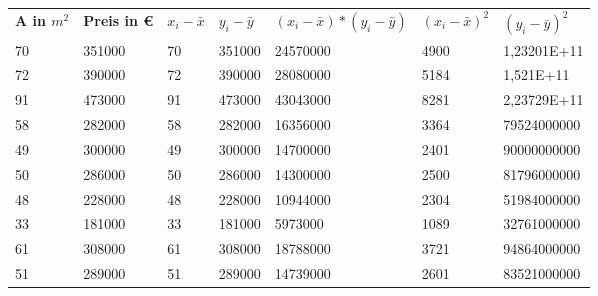 \begin{enumerate}
\begin{table}
\centering
{}
\label{Manuelle Regression}
\begin{tabular}{lllllll}
\textbf{A in $m^{2}$} & \textbf{Preis in \euro{} } & $x_i-\bar{x}$ & $y_i-\bar{y}$ & $(x_i-\bar{x})*(y_i-\bar{y})$ & $(x_i-\bar{x})^{2}$ & $(y_i-\bar{y})^{2}$  \\
70                    & 351000                 & 70                  & 351000              & 24570000                                    & 4900                    & 1,23201E+11             \\
72                    & 390000                 & 72                  & 390000              & 28080000                                    & 5184                    & 1,521E+11               \\
91                    & 473000                 & 91                  & 473000              & 43043000                                    & 8281                    & 2,23729E+11             \\
58                    & 282000                 & 58                  & 282000              & 16356000                                    & 3364                    & 79524000000             \\
49                    & 300000                 & 49                  & 300000              & 14700000                                    & 2401                    & 90000000000             \\
50                    & 286000                 & 50                  & 286000              & 14300000                                    & 2500                    & 81796000000             \\
48                    & 228000                 & 48                  & 228000              & 10944000                                    & 2304                    & 51984000000             \\
33                    & 181000                 & 33                  & 181000              & 5973000                                     & 1089                    & 32761000000             \\
61                    & 308000                 & 61                  & 308000              & 18788000                                    & 3721                    & 94864000000             \\
51                    & 289000                 & 51                  & 289000              & 14739000                                    & 2601                    & 83521000000             \\

\end{tabular}
\end{table}
\end{enumerate}
